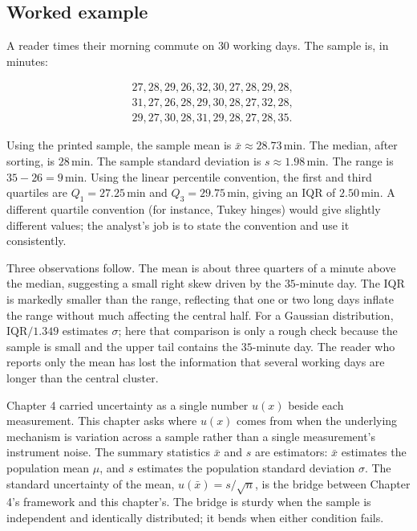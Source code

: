 \subsection{Worked example}

A reader times their morning commute on $30$ working days. The
sample is, in minutes:

\[
\begin{aligned}
&27, 28, 29, 26, 32, 30, 27, 28, 29, 28,\\
&31, 27, 26, 28, 29, 30, 28, 27, 32, 28,\\
&29, 27, 30, 28, 31, 29, 28, 27, 28, 35.
\end{aligned}
\]

Using the printed sample, the sample mean is $\bar{x} \approx 28.73
\,\text{min}$. The median, after sorting, is $28 \,\text{min}$. The
sample standard deviation is $s \approx 1.98 \,\text{min}$. The
range is $35 - 26 = 9 \,\text{min}$. Using the linear percentile
convention, the first and third quartiles are $Q_{1} = 27.25
\,\text{min}$ and $Q_{3} = 29.75 \,\text{min}$, giving an IQR of
$2.50 \,\text{min}$. A different quartile convention (for instance,
Tukey hinges) would give slightly different values; the analyst's
job is to state the convention and use it consistently.

Three observations follow. The mean is about three quarters of a
minute above the median, suggesting a small right skew driven by
the $35$-minute day. The IQR is markedly smaller than the range,
reflecting that one or two long days inflate the range without much
affecting the central half. For a Gaussian distribution,
$\text{IQR}/1.349$ estimates $\sigma$; here that comparison is only
a rough check because the sample is small and the upper tail
contains the $35$-minute day. The reader who reports only the mean
has lost the information that several working days are longer than
the central cluster.

\begin{archetype}
Chapter 4 carried uncertainty as a single number $u(x)$ beside each
measurement. This chapter asks where $u(x)$ comes from when the
underlying mechanism is variation across a sample rather than a
single measurement's instrument noise. The summary statistics
$\bar{x}$ and $s$ are estimators: $\bar{x}$ estimates the population
mean $\mu$, and $s$ estimates the population standard deviation
$\sigma$. The standard uncertainty of the mean, $u(\bar{x}) =
s/\sqrt{n}$, is the bridge between Chapter 4's framework and this
chapter's. The bridge is sturdy when the sample is independent and
identically distributed; it bends when either condition fails.
\end{archetype}

